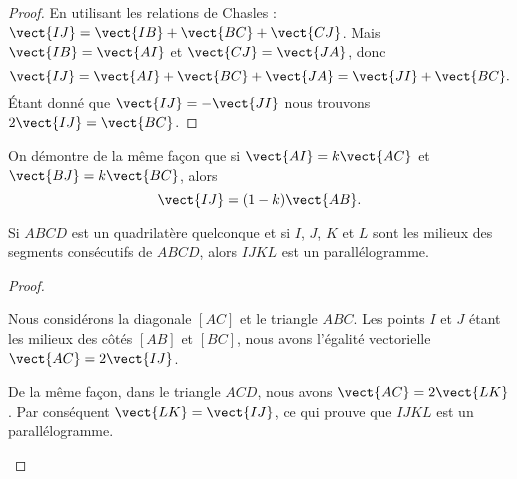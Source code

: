 \begin{proof}
    En utilisant les relations de Chasles : \( \vect{ IJ }=\vect{ IB }+\vect{ BC }+\vect{ CJ }\). Mais \( \vect{ IB }=\vect{ AI }\) et \( \vect{ CJ }=\vect{ JA }\), donc
    \begin{equation}
        \vect{ IJ }=\vect{ AI }+\vect{ BC }+\vect{ JA }=\vect{ JI }+\vect{ BC }.
    \end{equation}
    Étant donné que \( \vect{ IJ }=-\vect{ JI }\) nous trouvons \( 2\vect{ IJ }=\vect{ BC }\).
\end{proof}

On démontre de la même façon que si \( \vect{ AI }=k\vect{ AC }\) et \( \vect{ BJ }=k\vect{ BC }\), alors
\begin{equation}
    \vect{ IJ }=(1-k)\vect{ AB }.
\end{equation}

\begin{propriete}
    Si \( ABCD\) est un quadrilatère quelconque et si \( I\), \( J\), \( K\) et \( L\) sont les milieux des segments consécutifs de \( ABCD\), alors \( IJKL\) est un parallélogramme.
\end{propriete}

\begin{proof}

    \begin{multicols}{2}

        Nous considérons la diagonale \( [AC]\) et le triangle \( ABC\). Les points \( I\) et \( J\) étant les milieux des côtés \( [AB]\) et \( [BC]\), nous avons l'égalité vectorielle \( \vect{ AC }=2\vect{ IJ }\).

    De la même façon, dans le triangle \( ACD\), nous avons \( \vect{ AC }=2\vect{ LK }\). Par conséquent \( \vect{ LK }=\vect{ IJ }\), ce qui prouve que \( IJKL\) est un parallélogramme.

        \columnbreak

   \begin{center}

   \end{center}

    \end{multicols}


\end{proof}
